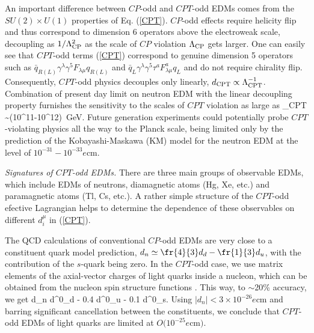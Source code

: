 \documentclass[prl,twocolumn,tightenlines,preprintnumbers,floatfix,nofootinbib]{revtex4}
\begin{document}
An important difference between $CP$-odd and $CPT$-odd EDMs comes from the 
$SU(2)\times U(1)$ properties of Eq. (\ref{CPT}). 
$CP$-odd effects require helicity flip and thus correspond to dimension 6 operators
above the electroweak scale, decoupling as $1/\Lambda^2_{\rm CP}$ as the scale of 
$CP$ violation $\Lambda_{\rm CP}$ gets larger. 
One can easily see that $CPT$-odd terms (\ref{CPT}) 
correspond to genuine dimension 
5 operators such as $\bar q_{R(L)} \gamma^\lambda \gamma^5 F_{\lambda\mu} q_{R(L)}$
and $\bar q_L \gamma^\lambda \gamma^5 \tau^a F^a_{\lambda\mu} q_L$ and do not
require chirality flip.  
Consequently, $CPT$-odd physics decouples only linearly, $d_{\rm CPT} \propto 
\Lambda_{\rm CPT}^{-1}$. Combination of present day limit on neutron EDM with the
linear decoupling property furnishes the sensitivity to the scales of $CPT$ violation as 
large as
\be
\Lambda_{\rm CPT} \sim (10^{11}-10^{12})~{\rm GeV}.
\label{range}
\ee
Future generation experiments could 
potentially probe $CPT$-violating physics all the way to the Planck 
scale, being limited only by the prediction of the Kobayashi-Maskawa (KM) model for the 
neutron EDM at the level of $10^{-31}-10^{-33}e$cm.


{\em Signatures of $CPT$-odd EDMs. }
There are three main groups of observable EDMs, which include EDMs of neutrons, 
diamagnetic atoms (Hg, Xe, etc.) and paramagnetic  atoms (Tl, Cs, etc.). 
A rather simple structure of the $CPT$-odd efective Lagrangian 
helps to determine the dependence of these
observables on different $d_i^\mu$ in  (\ref{CPT}).

The QCD calculations of conventional $CP$-odd EDMs \cite{PRann}
are very close 
to a constituent quark model prediction, $d_n \simeq \fr{4}{3} d_d- \fr{1}{3} d_u$,
with the contribution of the $s$-quark being zero. In the $CPT$-odd case, we use 
matrix elements of the axial-vector charges of light quarks inside a nucleon, 
which can be obtained from the nucleon spin structure functions \cite{EK}. 
This way, to $\sim$20\% accuracy, we get
\be
d_n  d^0_d - 0.4 d^0_u - 0.1 d^0_s.
\label{dn}
\ee
Using $|d_n| < 3\times 10^{-26} e$cm \cite{exp}
and barring significant cancellation between the constituents, 
we conclude that $CPT$-odd EDMs of light quarks are limited 
at $O(10^{-25}e$cm$)$.
\end{document}
